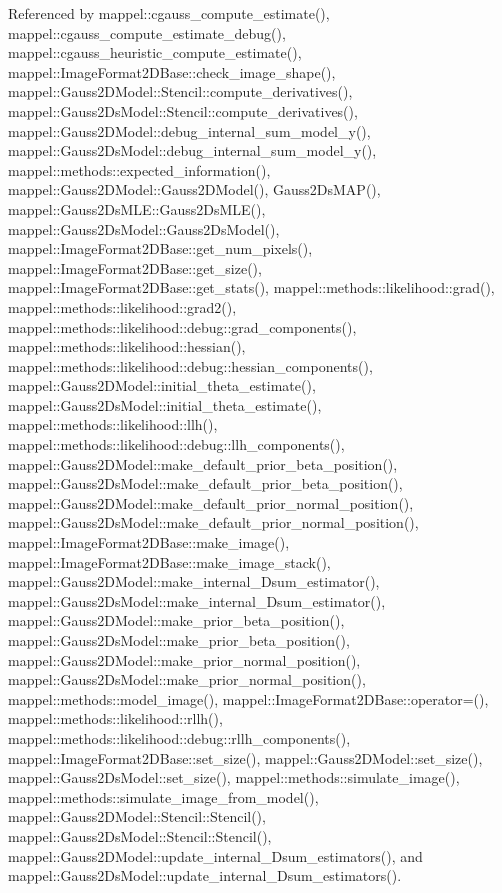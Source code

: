 Referenced by mappel\+::cgauss\+\_\+compute\+\_\+estimate(), mappel\+::cgauss\+\_\+compute\+\_\+estimate\+\_\+debug(), mappel\+::cgauss\+\_\+heuristic\+\_\+compute\+\_\+estimate(), mappel\+::\+Image\+Format2\+D\+Base\+::check\+\_\+image\+\_\+shape(), mappel\+::\+Gauss2\+D\+Model\+::\+Stencil\+::compute\+\_\+derivatives(), mappel\+::\+Gauss2\+Ds\+Model\+::\+Stencil\+::compute\+\_\+derivatives(), mappel\+::\+Gauss2\+D\+Model\+::debug\+\_\+internal\+\_\+sum\+\_\+model\+\_\+y(), mappel\+::\+Gauss2\+Ds\+Model\+::debug\+\_\+internal\+\_\+sum\+\_\+model\+\_\+y(), mappel\+::methods\+::expected\+\_\+information(), mappel\+::\+Gauss2\+D\+Model\+::\+Gauss2\+D\+Model(), Gauss2\+Ds\+M\+A\+P(), mappel\+::\+Gauss2\+Ds\+M\+L\+E\+::\+Gauss2\+Ds\+M\+L\+E(), mappel\+::\+Gauss2\+Ds\+Model\+::\+Gauss2\+Ds\+Model(), mappel\+::\+Image\+Format2\+D\+Base\+::get\+\_\+num\+\_\+pixels(), mappel\+::\+Image\+Format2\+D\+Base\+::get\+\_\+size(), mappel\+::\+Image\+Format2\+D\+Base\+::get\+\_\+stats(), mappel\+::methods\+::likelihood\+::grad(), mappel\+::methods\+::likelihood\+::grad2(), mappel\+::methods\+::likelihood\+::debug\+::grad\+\_\+components(), mappel\+::methods\+::likelihood\+::hessian(), mappel\+::methods\+::likelihood\+::debug\+::hessian\+\_\+components(), mappel\+::\+Gauss2\+D\+Model\+::initial\+\_\+theta\+\_\+estimate(), mappel\+::\+Gauss2\+Ds\+Model\+::initial\+\_\+theta\+\_\+estimate(), mappel\+::methods\+::likelihood\+::llh(), mappel\+::methods\+::likelihood\+::debug\+::llh\+\_\+components(), mappel\+::\+Gauss2\+D\+Model\+::make\+\_\+default\+\_\+prior\+\_\+beta\+\_\+position(), mappel\+::\+Gauss2\+Ds\+Model\+::make\+\_\+default\+\_\+prior\+\_\+beta\+\_\+position(), mappel\+::\+Gauss2\+D\+Model\+::make\+\_\+default\+\_\+prior\+\_\+normal\+\_\+position(), mappel\+::\+Gauss2\+Ds\+Model\+::make\+\_\+default\+\_\+prior\+\_\+normal\+\_\+position(), mappel\+::\+Image\+Format2\+D\+Base\+::make\+\_\+image(), mappel\+::\+Image\+Format2\+D\+Base\+::make\+\_\+image\+\_\+stack(), mappel\+::\+Gauss2\+D\+Model\+::make\+\_\+internal\+\_\+Dsum\+\_\+estimator(), mappel\+::\+Gauss2\+Ds\+Model\+::make\+\_\+internal\+\_\+Dsum\+\_\+estimator(), mappel\+::\+Gauss2\+D\+Model\+::make\+\_\+prior\+\_\+beta\+\_\+position(), mappel\+::\+Gauss2\+Ds\+Model\+::make\+\_\+prior\+\_\+beta\+\_\+position(), mappel\+::\+Gauss2\+D\+Model\+::make\+\_\+prior\+\_\+normal\+\_\+position(), mappel\+::\+Gauss2\+Ds\+Model\+::make\+\_\+prior\+\_\+normal\+\_\+position(), mappel\+::methods\+::model\+\_\+image(), mappel\+::\+Image\+Format2\+D\+Base\+::operator=(), mappel\+::methods\+::likelihood\+::rllh(), mappel\+::methods\+::likelihood\+::debug\+::rllh\+\_\+components(), mappel\+::\+Image\+Format2\+D\+Base\+::set\+\_\+size(), mappel\+::\+Gauss2\+D\+Model\+::set\+\_\+size(), mappel\+::\+Gauss2\+Ds\+Model\+::set\+\_\+size(), mappel\+::methods\+::simulate\+\_\+image(), mappel\+::methods\+::simulate\+\_\+image\+\_\+from\+\_\+model(), mappel\+::\+Gauss2\+D\+Model\+::\+Stencil\+::\+Stencil(), mappel\+::\+Gauss2\+Ds\+Model\+::\+Stencil\+::\+Stencil(), mappel\+::\+Gauss2\+D\+Model\+::update\+\_\+internal\+\_\+Dsum\+\_\+estimators(), and mappel\+::\+Gauss2\+Ds\+Model\+::update\+\_\+internal\+\_\+Dsum\+\_\+estimators().

